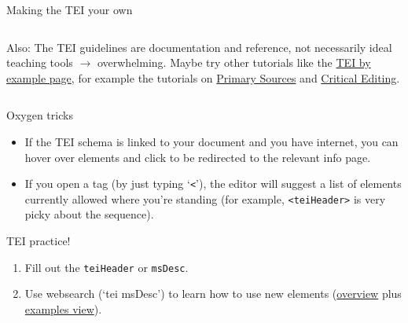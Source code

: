 \begin{frame}[allowframebreaks]{Making the TEI your own}
\begin{columns}
\begin{block}{}
\footnotesize
Also: The TEI guidelines are documentation and reference, not necessarily ideal teaching tools $\to$ overwhelming. Maybe try other tutorials like the \href{https://teibyexample.org/tutorials/TBED00v00.htm}{TEI by example page}, for example the tutorials on \alert{\href{https://teibyexample.org/tutorials/TBED06v00.htm}{Primary Sources}} and \alert{\href{https://teibyexample.org/tutorials/TBED07v00.htm}{Critical Editing}}.
\end{block}

\end{columns}

\framebreak

\begin{block}{Oxygen tricks}
\begin{itemize}\footnotesize
    \item If the TEI schema is linked to your document and you have internet, you can hover over elements and click to be redirected to the relevant info page. 
    \item If you open a tag (by just typing `\texttt{<}'), the editor will suggest a list of elements currently allowed where you're standing (for example, \texttt{<teiHeader>} is very picky about the sequence).
\end{itemize}
\end{block}

\end{frame}

\begin{frame}[standout]
    \alert{TEI practice!} \\
    \begin{enumerate}\small
        \item Fill out the \texttt{teiHeader} or \texttt{msDesc}.
        \item Use websearch (`tei msDesc') to learn how to use new elements (\href{https://tei-c.org/release/doc/tei-p5-doc/en/html/ref-msDesc.html}{overview} plus \href{https://tei-c.org/release/doc/tei-p5-doc/en/html/examples-msDesc.html}{examples view}).
    \end{enumerate} 
\end{frame}




